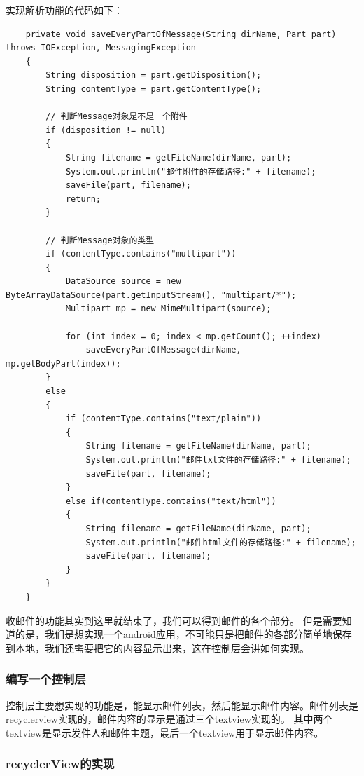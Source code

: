 \documentclass[a4paper,left=2.5cm,right=2.5cm,11pt]{article}
\begin{document}
	实现解析功能的代码如下：
	\begin{lstlisting}
	private void saveEveryPartOfMessage(String dirName, Part part) throws IOException, MessagingException
    {
        String disposition = part.getDisposition();
        String contentType = part.getContentType();

		// 判断Message对象是不是一个附件
        if (disposition != null)
        {
            String filename = getFileName(dirName, part);
            System.out.println("邮件附件的存储路径:" + filename);
            saveFile(part, filename);
            return;
        }

		// 判断Message对象的类型
        if (contentType.contains("multipart"))
        {
            DataSource source = new ByteArrayDataSource(part.getInputStream(), "multipart/*");
            Multipart mp = new MimeMultipart(source);

            for (int index = 0; index < mp.getCount(); ++index)
                saveEveryPartOfMessage(dirName, mp.getBodyPart(index));
        }
        else
        {
            if (contentType.contains("text/plain"))
            {
                String filename = getFileName(dirName, part);
                System.out.println("邮件txt文件的存储路径:" + filename);
                saveFile(part, filename);
            }
            else if(contentType.contains("text/html"))
            {
                String filename = getFileName(dirName, part);
                System.out.println("邮件html文件的存储路径:" + filename);
                saveFile(part, filename);
            }
        }
    }
	\end{lstlisting}

	收邮件的功能其实到这里就结束了，我们可以得到邮件的各个部分。
	但是需要知道的是，我们是想实现一个android应用，不可能只是把邮件的各部分简单地保存到本地，我们还需要把它的内容显示出来，这在控制层会讲如何实现。

\clearpage

\subsubsection{编写一个控制层}
	控制层主要想实现的功能是，能显示邮件列表，然后能显示邮件内容。邮件列表是recyclerview实现的，邮件内容的显示是通过三个textview实现的。
	其中两个textview是显示发件人和邮件主题，最后一个textview用于显示邮件内容。

\subsubsection{recyclerView的实现}
\end{document}
